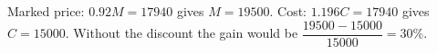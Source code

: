 Marked price: $0.92M=17940$ gives $M=19500$. Cost: $1.196C=17940$ gives $C=15000$. Without the discount the gain would be $\dfrac{19500-15000}{15000}=\boxed{30\%}$.
